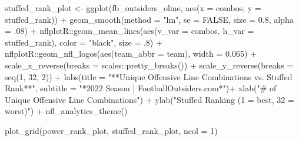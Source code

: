 \documentclass[
  letterpaper,
]{krantz}
\newenvironment{Shaded}{\begin{snugshade}}{\end{snugshade}}
\newcommand{\AttributeTok}[1]{\textcolor[rgb]{0.40,0.45,0.13}{#1}}
\newcommand{\ConstantTok}[1]{\textcolor[rgb]{0.56,0.35,0.01}{#1}}
\newcommand{\DecValTok}[1]{\textcolor[rgb]{0.68,0.00,0.00}{#1}}
\newcommand{\FloatTok}[1]{\textcolor[rgb]{0.68,0.00,0.00}{#1}}
\newcommand{\FunctionTok}[1]{\textcolor[rgb]{0.28,0.35,0.67}{#1}}
\newcommand{\NormalTok}[1]{\textcolor[rgb]{0.00,0.23,0.31}{#1}}
\newcommand{\OtherTok}[1]{\textcolor[rgb]{0.00,0.23,0.31}{#1}}
\newcommand{\SpecialCharTok}[1]{\textcolor[rgb]{0.37,0.37,0.37}{#1}}
\newcommand{\StringTok}[1]{\textcolor[rgb]{0.13,0.47,0.30}{#1}}
\begin{document}
\begin{Shaded}
\begin{Highlighting}[]
\NormalTok{stuffed\_rank\_plot }\OtherTok{\textless{}{-}} \FunctionTok{ggplot}\NormalTok{(fb\_outsiders\_oline,}
                            \FunctionTok{aes}\NormalTok{(}\AttributeTok{x =}\NormalTok{ combos, }\AttributeTok{y =}\NormalTok{ stuffed\_rank)) }\SpecialCharTok{+}
  \FunctionTok{geom\_smooth}\NormalTok{(}\AttributeTok{method =} \StringTok{"lm"}\NormalTok{, }\AttributeTok{se =} \ConstantTok{FALSE}\NormalTok{, }\AttributeTok{size =} \FloatTok{0.8}\NormalTok{, }\AttributeTok{alpha =}\NormalTok{ .}\DecValTok{08}\NormalTok{) }\SpecialCharTok{+}
\NormalTok{  nflplotR}\SpecialCharTok{::}\FunctionTok{geom\_mean\_lines}\NormalTok{(}\FunctionTok{aes}\NormalTok{(}\AttributeTok{v\_var =}\NormalTok{ combos,}
                                \AttributeTok{h\_var =}\NormalTok{ stuffed\_rank),}
                            \AttributeTok{color =} \StringTok{"black"}\NormalTok{,}
                            \AttributeTok{size =}\NormalTok{ .}\DecValTok{8}\NormalTok{) }\SpecialCharTok{+}
\NormalTok{  nflplotR}\SpecialCharTok{::}\FunctionTok{geom\_nfl\_logos}\NormalTok{(}\FunctionTok{aes}\NormalTok{(}\AttributeTok{team\_abbr =}\NormalTok{ team), }\AttributeTok{width =} \FloatTok{0.065}\NormalTok{) }\SpecialCharTok{+}
  \FunctionTok{scale\_x\_reverse}\NormalTok{(}\AttributeTok{breaks =}\NormalTok{ scales}\SpecialCharTok{::}\FunctionTok{pretty\_breaks}\NormalTok{()) }\SpecialCharTok{+}
  \FunctionTok{scale\_y\_reverse}\NormalTok{(}\AttributeTok{breaks =} \FunctionTok{seq}\NormalTok{(}\DecValTok{1}\NormalTok{, }\DecValTok{32}\NormalTok{, }\DecValTok{2}\NormalTok{)) }\SpecialCharTok{+}
  \FunctionTok{labs}\NormalTok{(}\AttributeTok{title =} \StringTok{"**Unique Offensive Line Combinations vs.}
\StringTok{       Stuffed Rank**"}\NormalTok{,}
       \AttributeTok{subtitle =} \StringTok{"*2022 Season  |  FootballOutsiders.com*"}\NormalTok{)}\SpecialCharTok{+}
  \FunctionTok{xlab}\NormalTok{(}\StringTok{"\# of Unique Offensive Line Combinations"}\NormalTok{) }\SpecialCharTok{+}
  \FunctionTok{ylab}\NormalTok{(}\StringTok{"Stuffed Ranking (1 = best, 32 = worst)"}\NormalTok{) }\SpecialCharTok{+}
  \FunctionTok{nfl\_analytics\_theme}\NormalTok{()}

\FunctionTok{plot\_grid}\NormalTok{(power\_rank\_plot, stuffed\_rank\_plot, }\AttributeTok{ncol =} \DecValTok{1}\NormalTok{)}
\end{Highlighting}
\end{Shaded}
\end{document}
